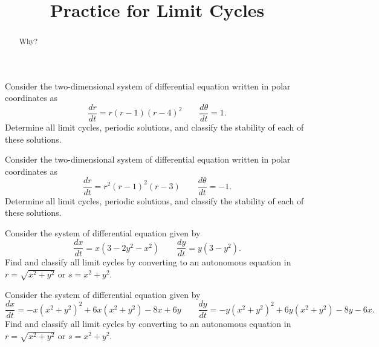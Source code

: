 \documentclass{ximera}
\title{Practice for Limit Cycles}
\begin{document}
\begin{abstract}
Why?
\end{abstract}
\maketitle



\begin{exercise}
    Consider the two-dimensional system of differential equation written in polar coordinates as
    \[ 
        \frac{dr}{dt} = r(r-1)(r-4)^2 \qquad \frac{d\theta}{dt} = 1. 
    \] 
    Determine all limit cycles, periodic solutions, and classify the stability of each of these solutions. 
\end{exercise}

\begin{exercise}
    Consider the two-dimensional system of differential equation written in polar coordinates as
    \[ 
        \frac{dr}{dt} = r^2(r-1)^2(r-3) \qquad \frac{d\theta}{dt} = -1. 
    \] 
    Determine all limit cycles, periodic solutions, and classify the stability of each of these solutions. 
\end{exercise}

\begin{exercise}%
    Consider the system of differential equation given by
    \[ 
        \frac{dx}{dt} = x(3- 2y^2 - x^2) \qquad \frac{dy}{dt} = y(3-y^2) .
    \]
    Find and classify all limit cycles by converting to an autonomous equation in $r = \sqrt{x^2 + y^2}$ or $s = x^2 + y^2$. 
\end{exercise}

\begin{exercise}%
    Consider the system of differential equation given by
    \[ 
        \frac{dx}{dt} = -x(x^2 + y^2)^2 + 6x(x^2 + y^2) - 8x + 6y \qquad \frac{dy}{dt} = -y(x^2 + y^2)^2 + 6y(x^2 + y^2) - 8y - 6x .
    \]
    Find and classify all limit cycles by converting to an autonomous equation in $r = \sqrt{x^2 + y^2}$ or $s = x^2 + y^2$. 
\end{exercise}
\end{document}
